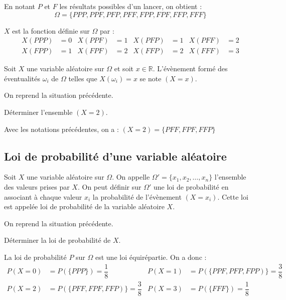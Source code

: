 \documentclass[french]{book}
\newcommand{\R}{\mathbb {R}}
\begin{document}
En notant $P$ et $F$ les r\'esultats possibles d'un lancer, on obtient : 
\[\Omega = \{PPP,PPF,PFP,PFF,FPP,FPF,FFP,FFF\}\]

$X$ est la fonction d\'efinie sur $\Omega$ par :
\begin{align*}
X(PPP)&=0 & X(PPF)&=1 & X(PFP)&=1 & X(PFF)&=2\\
X(FPP)&=1 & X(FPF)&=2 & X(FFP)&=2 & X(FFF)&=3
\end{align*}
\begin{defn}
Soit $X$ une variable al\'eatoire sur $\Omega$ et soit $x\in\R$. L'\'ev\`enement form\'e des \'eventualit\'es $\omega_i$ de $\Omega$ telles que $X(\omega_i)=x$ se note $(X=x)$.
\vspace{2mm}
\end{defn}

\begin{exemple}
On reprend la situation pr\'ec\'edente.

D\'eterminer l'ensemble $(X=2)$.
\end{exemple}


Avec les notations pr\'ec\'edentes, on a : $(X=2)=\{PFF,FPF,FFP\}$


\subsection{Loi de probabilit\'e d'une variable al\'eatoire}
\begin{defn}
Soit $X$ une variable al\'eatoire sur $\Omega$. On appelle $\Omega'=\{x_1,x_2,\ldots,x_n\}$ l'ensemble des valeurs prises par $X$. On peut d\'efinir sur $\Omega'$ une loi de probabilit\'e en associant à chaque valeur $x_i$ la probabilit\'e de l'\'ev\`enement $(X=x_i)$. Cette loi est appel\'ee loi de probabilit\'e de la variable al\'eatoire $X$.
\end{defn}

\begin{exemple}
On reprend la situation pr\'ec\'edente.

D\'eterminer la loi de probabilit\'e de $X$.
\end{exemple}


La loi de probabilit\'e $P$ sur $\Omega$ est une loi \'equir\'epartie. On a donc :
\begin{align*}
P(X=0)&=P(\{PPP\})=\dfrac{1}{8} & P(X=1)&=P(\{PPF,PFP,FPP)\}=\dfrac{3}{8} \\
P(X=2)&=P(\{PFF,FPF,FFP)\}=\dfrac{3}{8} & P(X=3)&=P(\{FFF\})=\dfrac{1}{8}
\end{align*}
\end{document}
